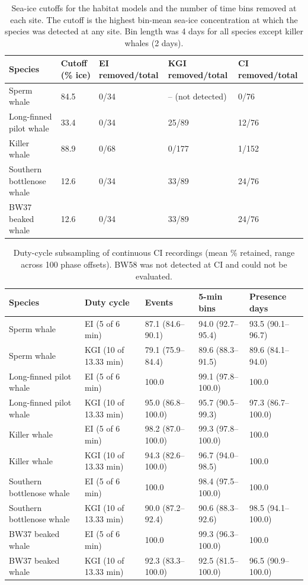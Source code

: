 \documentclass[
  11pt,
]{article}
\begin{document}
\begin{table}[!h]
\centering
\caption{\label{tab:icecut}Sea-ice cutoffs for the habitat models and the number of time bins removed at each site. The cutoff is the highest bin-mean sea-ice concentration at which the species was detected at any site. Bin length was 4 days for all species except killer whales (2 days).}
\centering
\fontsize{9}{11}\selectfont
\begin{tabular}[t]{lllll}
\toprule
Species & Cutoff (\% ice) & EI removed/total & KGI removed/total & CI removed/total\\
\midrule
Sperm whale & 84.5 & 0/34 & -- (not detected) & 0/76\\
Long-finned pilot whale & 33.4 & 0/34 & 25/89 & 12/76\\
Killer whale & 88.9 & 0/68 & 0/177 & 1/152\\
Southern bottlenose whale & 12.6 & 0/34 & 33/89 & 24/76\\
BW37 beaked whale & 12.6 & 0/34 & 33/89 & 24/76\\
\bottomrule
\end{tabular}
\end{table}

\begin{table}[!h]
\centering
\caption{\label{tab:duty}Duty-cycle subsampling of continuous CI recordings (mean \% retained, range across 100 phase offsets). BW58 was not detected at CI and could not be evaluated.}
\centering
\fontsize{9}{11}\selectfont
\begin{tabular}[t]{lllll}
\toprule
Species & Duty cycle & Events & 5-min bins & Presence days\\
\midrule
Sperm whale & EI (5 of 6 min) & 87.1 (84.6–90.1) & 94.0 (92.7–95.4) & 93.5 (90.1–96.7)\\
Sperm whale & KGI (10 of 13.33 min) & 79.1 (75.9–84.4) & 89.6 (88.3–91.5) & 89.6 (84.1–94.0)\\
Long-finned pilot whale & EI (5 of 6 min) & 100.0 & 99.1 (97.8–100.0) & 100.0\\
Long-finned pilot whale & KGI (10 of 13.33 min) & 95.0 (86.8–100.0) & 95.7 (90.5–99.3) & 97.3 (86.7–100.0)\\
Killer whale & EI (5 of 6 min) & 98.2 (87.0–100.0) & 99.3 (97.8–100.0) & 100.0\\
Killer whale & KGI (10 of 13.33 min) & 94.3 (82.6–100.0) & 96.7 (94.0–98.5) & 100.0\\
Southern bottlenose whale & EI (5 of 6 min) & 100.0 & 98.4 (97.5–100.0) & 100.0\\
Southern bottlenose whale & KGI (10 of 13.33 min) & 90.0 (87.2–92.4) & 90.6 (88.3–92.6) & 98.5 (94.1–100.0)\\
BW37 beaked whale & EI (5 of 6 min) & 100.0 & 99.3 (96.3–100.0) & 100.0\\
BW37 beaked whale & KGI (10 of 13.33 min) & 92.3 (83.3–100.0) & 92.5 (81.5–100.0) & 96.5 (90.9–100.0)\\
\bottomrule
\end{tabular}
\end{table}
\end{document}
